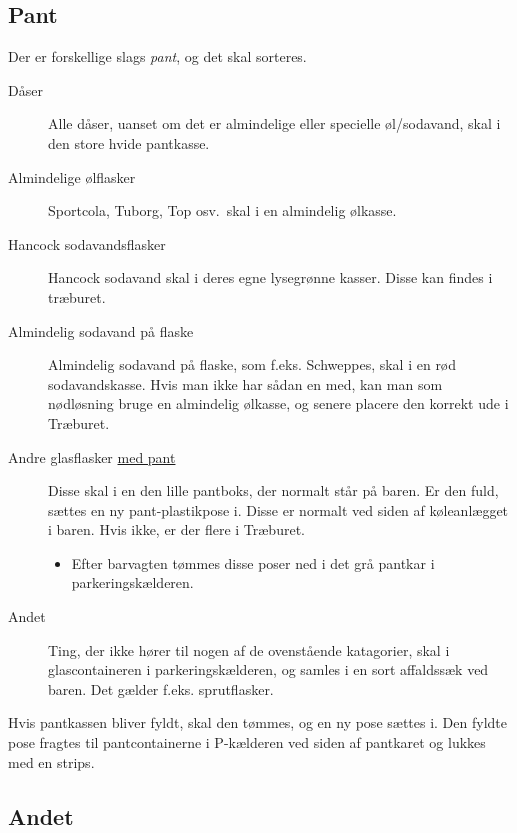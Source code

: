 \subsection{Pant}
\label{sec:intra:pant}

Der er forskellige slags \textit{pant}, og det skal sorteres.
\begin{description}
    \item[Dåser] Alle dåser, uanset om det er almindelige eller specielle
        øl/sodavand, skal i den store hvide pantkasse.
    \item[Almindelige ølflasker] Sportcola, Tuborg, Top osv.\ skal i en almindelig ølkasse.
    \item[Hancock sodavandsflasker] Hancock sodavand skal i deres egne lysegrønne kasser. Disse kan findes i træburet.
    \item[Almindelig sodavand på flaske] Almindelig sodavand på flaske, som f.eks. Schweppes, skal i en
    rød sodavandskasse. Hvis man ikke har sådan en med, kan man som
    nødløsning bruge en almindelig ølkasse, og senere placere den korrekt ude i Træburet.
    \item[Andre glasflasker \underline{med pant}] Disse skal i en den lille pantboks, der normalt står på baren.
    Er den fuld, sættes en ny pant-plastikpose i. Disse er normalt ved siden af køleanlægget i baren. 
    Hvis ikke, er der flere i Træburet.
    \begin{itemize}
        \item Efter barvagten tømmes disse poser ned i det grå pantkar i parkeringskælderen.
    \end{itemize}
    \item[Andet] Ting, der ikke hører til nogen af de ovenstående
    katagorier, skal i glascontaineren i parkeringskælderen,
    og samles i en sort affaldssæk ved baren. Det gælder f.eks. sprutflasker.
\end{description}

Hvis pantkassen bliver fyldt, skal den tømmes, og en ny pose sættes i. 
Den fyldte pose fragtes til pantcontainerne i P-kælderen ved siden af pantkaret og 
lukkes med en strips.

\subsection{Andet}
\label{sec:intra:andet}

